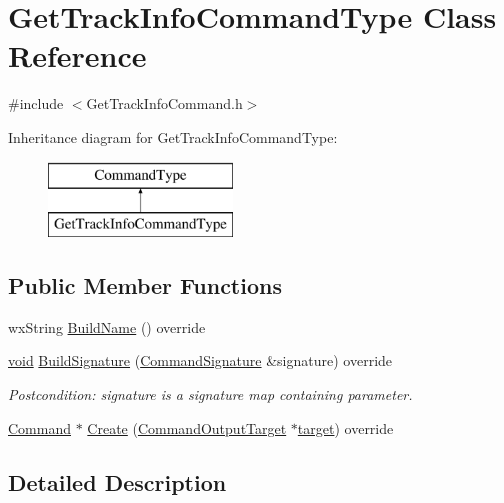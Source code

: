 \hypertarget{class_get_track_info_command_type}{}\section{Get\+Track\+Info\+Command\+Type Class Reference}
\label{class_get_track_info_command_type}


{\ttfamily \#include $<$Get\+Track\+Info\+Command.\+h$>$}

Inheritance diagram for Get\+Track\+Info\+Command\+Type\+:\begin{figure}[H]
\begin{center}
\leavevmode
\includegraphics[height=2.000000cm]{class_get_track_info_command_type}
\end{center}
\end{figure}
\subsection*{Public Member Functions}
\begin{DoxyCompactItemize}
\item 
wx\+String \hyperlink{class_get_track_info_command_type_a15a2436c823794df7a10b33c3e90ab03}{Build\+Name} () override
\item 
\hyperlink{sound_8c_ae35f5844602719cf66324f4de2a658b3}{void} \hyperlink{class_get_track_info_command_type_a5794e290958e11536d86b15133a8f978}{Build\+Signature} (\hyperlink{class_command_signature}{Command\+Signature} \&signature) override
\begin{DoxyCompactList}\small\item\em Postcondition\+: signature is a \textquotesingle{}signature\textquotesingle{} map containing parameter. \end{DoxyCompactList}\item 
\hyperlink{class_command}{Command} $\ast$ \hyperlink{class_get_track_info_command_type_a9c4a49c2b7a3f877afb1da059e812f6f}{Create} (\hyperlink{class_command_output_target}{Command\+Output\+Target} $\ast$\hyperlink{lib_2expat_8h_a15a257516a87decb971420e718853137}{target}) override
\end{DoxyCompactItemize}


\subsection{Detailed Description}


